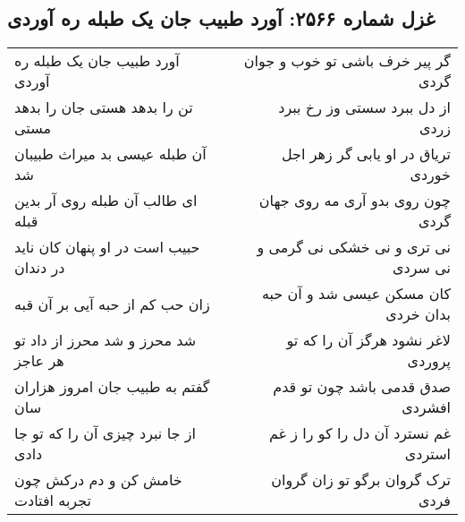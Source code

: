\begin{center}
\section*{غزل شماره ۲۵۶۶: آورد طبیب جان یک طبله ره آوردی}
\label{sec:2566}
\begin{longtable}{l p{0.5cm} r}
آورد طبیب جان یک طبله ره آوردی
&&
گر پیر خرف باشی تو خوب و جوان گردی
\\
تن را بدهد هستی جان را بدهد مستی
&&
از دل ببرد سستی وز رخ ببرد زردی
\\
آن طبله عیسی بد میراث طبیبان شد
&&
تریاق در او یابی گر زهر اجل خوردی
\\
ای طالب آن طبله روی آر بدین قبله
&&
چون روی بدو آری مه روی جهان گردی
\\
حبیب است در او پنهان کان ناید در دندان
&&
نی تری و نی خشکی نی گرمی و نی سردی
\\
زان حب کم از حبه آیی بر آن قبه
&&
کان مسکن عیسی شد و آن حبه بدان خردی
\\
شد محرز و شد محرز از داد تو هر عاجز
&&
لاغر نشود هرگز آن را که تو پروردی
\\
گفتم به طبیب جان امروز هزاران سان
&&
صدق قدمی باشد چون تو قدم افشردی
\\
از جا نبرد چیزی آن را که تو جا دادی
&&
غم نسترد آن دل را کو را ز غم استردی
\\
خامش کن و دم درکش چون تجربه افتادت
&&
ترک گروان برگو تو زان گروان فردی
\\
\end{longtable}
\end{center}

